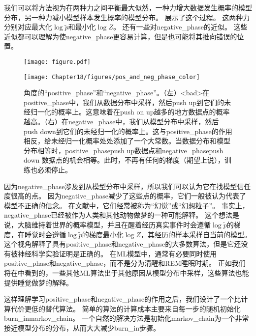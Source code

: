 我们可以将方法视为在两种力之间平衡最大似然，一种力增大数据发生概率的模型分布，另一种力减小模型样本发生概率的模型分布。
展示了这个过程。
这两种力分别对应最大化$\log \tilde{p}$和最小化$\log Z$。
还有一些对\gls{negative_phase}的近似。
这些近似都可以理解为使\gls{negative_phase}更容易计算，但是也可能将其推向错误的位置。

\begin{figure}[!htb]
\ifOpenSource
\centerline{\texttt{[image: figure.pdf]}}
\else
\centerline{\texttt{[image: Chapter18/figures/pos\_and\_neg\_phase\_color]}}
\fi
\caption{角度的``\gls{positive_phase}''和``\gls{negative_phase}''。（左）<bad>在\gls{positive_phase}中，我们从数据分布中采样，然后push up到它们的未经归一化的概率上。这意味着在push on up越多的地方数据点的概率越高。（右）在\gls{negative_phase}中，我们从模型分布中采样，然后push down到它们的未经归一化的概率上。这与\gls{positive_phase}的作用相反，给未经归一化概率处处添加了一个大常数。当数据分布和模型分布相等时，\gls{positive_phase}push up数据点和\gls{negative_phase}push down 数据点的机会相等。此时，不再有任何的梯度（期望上说），训练也必须停止。}
\label{fig:chap18_pos_and_neg_phase}
\end{figure}


因为\gls{negative_phase}涉及到从模型分布中采样，所以我们可以认为它在找模型信任度很高的点。
因为\gls{negative_phase}减少了这些点的概率，它们一般被认为代表了模型不正确的信念。
在文献中，它们经常被称为``幻觉''或``幻想粒子''。
事实上，\gls{negative_phase}已经被作为人类和其他动物做梦的一种可能解释\citep{CrickMitchison83}。
这个想法是说，大脑维持着世界的概率模型，并且在醒着经历真实事件时会遵循$\log \tilde{p}$的梯度，在睡觉时会遵循$\log \tilde{p}$的梯度最小化$\log Z$，其经历的样本采样自当前的模型。
这个视角解释了具有\gls{positive_phase}和\gls{negative_phase}的大多数算法，但是它还没有被神经科学实验证明是正确的。
在\gls{ML}模型中，通常有必要同时使用\gls{positive_phase}和\gls{negative_phase}，而不是分为清醒和REM睡眠时期。
正如我们将在中看到的，一些其他\gls{ML}算法出于其他原因从模型分布中采样，这些算法也能提供睡觉做梦的解释。


这样理解学习\gls{positive_phase}和\gls{negative_phase}的作用之后，我们设计了一个比计算代价更低的替代算法。
简单的算法的计算成本主要来自每一步的随机初始化\gls{burn_in}\gls{markov_chain}。
一个自然的解决方法是初始化\gls{markov_chain}为一个非常接近模型分布的分布，从而大大减少\gls{burn_in}步骤。

